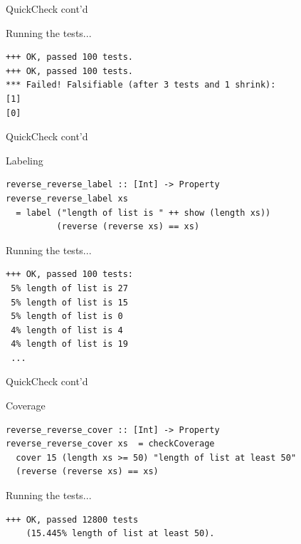 \documentclass{beamer} %
\begin{document}
\begin{frame}[fragile]{QuickCheck cont'd}
\begin{block}{Running the tests...}
\begin{footnotesize}
\begin{verbatim}
+++ OK, passed 100 tests.
+++ OK, passed 100 tests.
*** Failed! Falsifiable (after 3 tests and 1 shrink):     
[1]
[0]
\end{verbatim}
\end{footnotesize}
\end{block}
\end{frame}

\begin{frame}[fragile]{QuickCheck cont'd}
\begin{block}{Labeling}
\begin{verbatim}
reverse_reverse_label :: [Int] -> Property
reverse_reverse_label xs  
  = label ("length of list is " ++ show (length xs)) 
          (reverse (reverse xs) == xs)
\end{verbatim}
\end{block}

\begin{block}{Running the tests...}
\begin{footnotesize}
\begin{verbatim}
+++ OK, passed 100 tests:
 5% length of list is 27
 5% length of list is 15
 5% length of list is 0
 4% length of list is 4
 4% length of list is 19
 ...
\end{verbatim}
\end{footnotesize}
\end{block}
\end{frame}

\begin{frame}[fragile]{QuickCheck cont'd}
\begin{block}{Coverage}
\begin{verbatim}
reverse_reverse_cover :: [Int] -> Property
reverse_reverse_cover xs  = checkCoverage 
  cover 15 (length xs >= 50) "length of list at least 50"
  (reverse (reverse xs) == xs)
\end{verbatim}
\end{block}

\begin{block}{Running the tests...}
\begin{footnotesize}
\begin{verbatim}
+++ OK, passed 12800 tests 
    (15.445% length of list at least 50).
\end{verbatim}
\end{footnotesize}
\end{block}
\end{frame}
\end{document}
